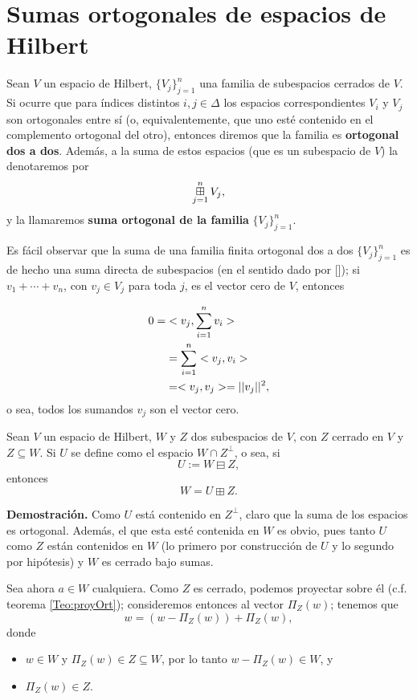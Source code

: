 \section{Sumas ortogonales de espacios de Hilbert}

\begin{defi} \label{def: suma ortogonal finita de subespacios ortogonales dos a dos}
Sean $V$ un espacio de Hilbert, 
$\{ V_{j} \}_{j=1}^{n}$ una familia de subespacios cerrados
de $V$. Si ocurre que para índices distintos 
$i,j \in \Delta$ los espacios correspondientes
$V_{i}$ y $V_{j}$ son ortogonales entre sí (o, equivalentemente,
que uno esté contenido en el complemento ortogonal
del otro), entonces
diremos que la familia es 
\textbf{ortogonal dos a dos}. Además, a la suma
de estos espacios (que es un subespacio de $V$)
la denotaremos por
\[
\operatorname*{{\boxplus}}_{j =1 }^{n} V_{j},
\]
y la llamaremos \textbf{suma ortogonal de la familia}
$\{ V_{j} \}_{j=1}^{n}$.
\end{defi}

Es fácil observar que la suma de una familia finita
ortogonal dos a dos $\{ V_{j} \}_{j=1}^{n}$
es de hecho una suma directa
de subespacios (en el sentido dado por []);
si $v_{1} + \cdots +v_{n}$, con $v_{j} \in V_{j}$
para toda $j$, es el vector cero de $V$, entonces

\begin{align*}
0 =  & < v_{j} , \sum\limits_{i=1}^{n}v_{i} > \\
& = \sum\limits_{i=1}^{n}<v_{j} , v_{i}> \\
& =< v_{j} , v_{j} > = || v_{j} ||^{2},
\end{align*}
o sea, todos los sumandos $v_{j}$
son el vector cero. \\

\begin{prop} \label{prop: pasar de resta ortogonal a suma ortogonal}
Sean $V$ un espacio de Hilbert, $W$ y $Z$ dos subespacios
de $V$, con $Z$ cerrado en $V$ y $Z \subseteq W$.
Si $U$ se define como el espacio $W \cap Z^{\perp}$, 
o sea, si 
\[
U:= W \boxminus Z,
\]
entonces 
\[
W= U \boxplus Z.
\]
\end{prop}
\noindent
\textbf{Demostración.}
Como $U$ está contenido en $Z^{\perp}$, 
claro que la suma de los espacios es ortogonal.
Además, el que esta esté contenida en $W$ es obvio,
pues tanto $U$ como $Z$ están contenidos en $W$
(lo primero por construcción de $U$ y lo 
segundo por hipótesis) y $W$ es 
cerrado bajo sumas.

Sea ahora $a \in W$ cualquiera. 
Como $Z$ es cerrado, podemos proyectar sobre él (c.f. teorema
\ref{Teo:proyOrt}); consideremos entonces al vector
$\Pi_{Z}(w)$; tenemos que
\[
w= (w-\Pi_{Z}(w))+\Pi_{Z}(w),
\]
donde
\begin{itemize}
\item $ w \in W$ y $\Pi_{Z}(w) \in Z \subseteq W$, por lo tanto
$w-\Pi_{Z}(w) \in W$, y
\item $\Pi_{Z}(w) \in Z$.
\end{itemize}
\QEDB
\vspace{0.2cm}

